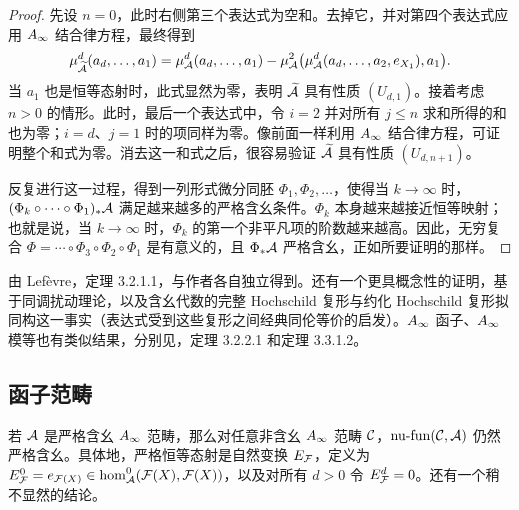 \begin{proof}
先设 $n=0$，此时右侧第三个表达式为空和。去掉它，并对第四个表达式应用 $A_\infty$ 结合律方程，最终得到
\[
\mu^d_{\widetilde{\mathcal A}}(a_d,\ldots,a_1)
=\mu^d_{\mathcal A}(a_d,\ldots,a_1)-\mu^2_{\mathcal A}\bigl(\mu^d_{\mathcal A}(a_d,\ldots,a_2,e_{X_1}),a_1\bigr).
\]
当 $a_1$ 也是恒等态射时，此式显然为零，表明 $\widetilde{\mathcal A}$ 具有性质 $(U_{d,1})$。接着考虑 $n>0$ 的情形。此时，最后一个表达式中，令 $i=2$ 并对所有 $j\le n$ 求和所得的和也为零；$i=d$、$j=1$ 时的项同样为零。像前面一样利用 $A_\infty$ 结合律方程，可证明整个和式为零。消去这一和式之后，很容易验证 $\widetilde{\mathcal A}$ 具有性质 $(U_{d,n+1})$。

反复进行这一过程，得到一列形式微分同胚 $\Phi_1,\Phi_2,\ldots$，使得当 $k\to\infty$ 时，$(\Phi_k\circ\cdots\circ\Phi_1)_*\mathcal A$ 满足越来越多的严格含幺条件。$\Phi_k$ 本身越来越接近恒等映射；也就是说，当 $k\to\infty$ 时，$\Phi_k$ 的第一个非平凡项的阶数越来越高。因此，无穷复合 $\Phi=\cdots\circ\Phi_3\circ\Phi_2\circ\Phi_1$ 是有意义的，且 $\Phi_*\mathcal A$ 严格含幺，正如所要证明的那样。
\end{proof}

\begin{note}\label{st:2.2}
由 Lefèvre，定理 3.2.1.1，与作者各自独立得到。还有一个更具概念性的证明，基于同调扰动理论，以及含幺代数的完整 Hochschild 复形与约化 Hochschild 复形拟同构这一事实（表达式受到这些复形之间经典同伦等价的启发）。$A_\infty$ 函子、$A_\infty$ 模等也有类似结果，分别见，定理 3.2.2.1 和定理 3.3.1.2。
\end{note}

\subsection{函子范畴}\label{sec:2b}
若 $\mathcal A$ 是严格含幺 $A_\infty$ 范畴，那么对任意非含幺 $A_\infty$ 范畴 $\mathcal C$，$\operatorname{nu\text{-}fun}(\mathcal C,\mathcal A)$ 仍然严格含幺。具体地，严格恒等态射是自然变换 $E_{\mathcal F}$，定义为 $E^0_{\mathcal F}=e_{\mathcal F(X)}\in\hom^0_{\mathcal A}(\mathcal F(X),\mathcal F(X))$，以及对所有 $d>0$ 令 $E^d_{\mathcal F}=0$。还有一个稍不显然的结论。

